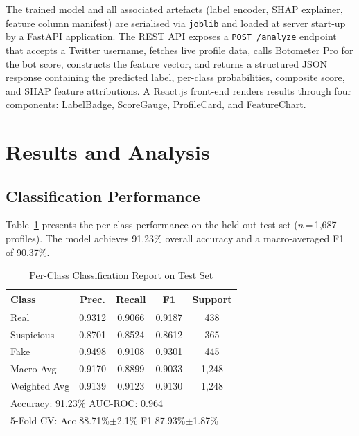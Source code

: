 \documentclass[conference]{IEEEtran}
\begin{document}
The trained model and all associated artefacts (label encoder, SHAP
explainer, feature column manifest) are serialised via \texttt{joblib}
and loaded at server start-up by a FastAPI application. The REST API
exposes a \texttt{POST /analyze} endpoint that accepts a Twitter
username, fetches live profile data, calls Botometer Pro for the bot
score, constructs the feature vector, and returns a structured JSON
response containing the predicted label, per-class probabilities,
composite score, and SHAP feature attributions. A React.js front-end
renders results through four components: LabelBadge, ScoreGauge,
ProfileCard, and FeatureChart.

\section{Results and Analysis}
\label{sec:results}

\subsection{Classification Performance}

Table~\ref{tab:results} presents the per-class performance on the
held-out test set ($n$\,=\,1,687 profiles). The model achieves 91.23\%
overall accuracy and a macro-averaged F1 of 90.37\%.

\begin{table}[htbp]
  \caption{Per-Class Classification Report on Test Set}
  \label{tab:results}
  \begin{center}
    \begin{tabular}{|l|c|c|c|c|}
      \hline
      \textbf{Class} & \textbf{Prec.} & \textbf{Recall} & \textbf{F1} & \textbf{Support} \\
      \hline
      Real            & 0.9312 & 0.9066 & 0.9187 & 438 \\
      Suspicious      & 0.8701 & 0.8524 & 0.8612 & 365 \\
      Fake            & 0.9498 & 0.9108 & 0.9301 & 445 \\
      \hline
      Macro Avg       & 0.9170 & 0.8899 & 0.9033 & 1,248 \\
      Weighted Avg    & 0.9139 & 0.9123 & 0.9130 & 1,248 \\
      \hline
      \multicolumn{5}{|l|}{Accuracy: 91.23\% \quad AUC-ROC: 0.964} \\
      \multicolumn{5}{|l|}{5-Fold CV: Acc 88.71\%$\pm$2.1\% \; F1 87.93\%$\pm$1.87\%} \\
      \hline
    \end{tabular}
  \end{center}
\end{table}
\end{document}
